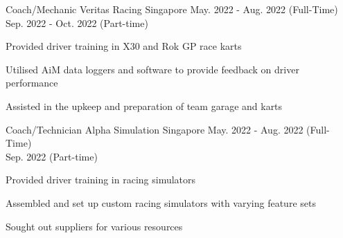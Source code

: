 

\begin{cventries}

  \cventry
    {Coach/Mechanic} %
    {Veritas Racing} %
    {Singapore} %
    {May. 2022 - Aug. 2022 (Full-Time)}\\{Sep. 2022 - Oct. 2022 (Part-time)} %
    {
      \begin{cvitems} %
        \item {Provided driver training in X30 and Rok GP race karts}
        \item {Utilised AiM data loggers and software to provide feedback on driver performance}
        \item {Assisted in the upkeep and preparation of team garage and karts}
      \end{cvitems}
    }

  \cventry
    {Coach/Technician} %
    {Alpha Simulation} %
    {Singapore} %
    {May. 2022 - Aug. 2022 (Full-Time)}\\{Sep. 2022 (Part-time)} %
    {
      \begin{cvitems} %
        \item {Provided driver training in racing simulators}
        \item {Assembled and set up custom racing simulators with varying feature sets}
        \item {Sought out suppliers for various resources}
      \end{cvitems}
    }



\end{cventries}
